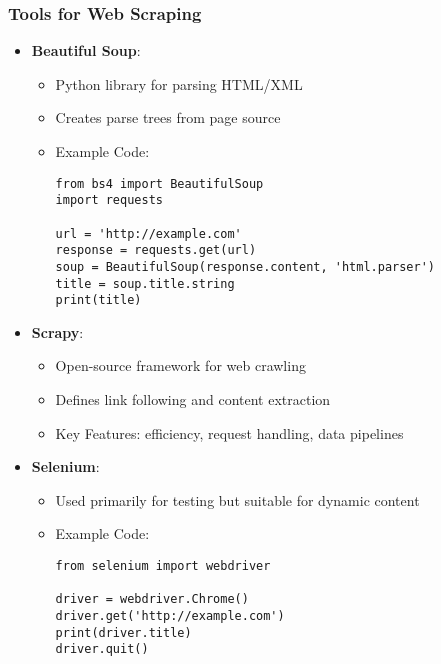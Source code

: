 \documentclass{beamer}
\begin{document}
\begin{frame}[fragile]
    \frametitle{Tools for Web Scraping}
    \begin{itemize}
        \item \textbf{Beautiful Soup}: 
            \begin{itemize}
                \item Python library for parsing HTML/XML 
                \item Creates parse trees from page source 
                \item Example Code:
                \begin{lstlisting}
from bs4 import BeautifulSoup
import requests

url = 'http://example.com'
response = requests.get(url)
soup = BeautifulSoup(response.content, 'html.parser')
title = soup.title.string
print(title)
                \end{lstlisting}
            \end{itemize}

        \item \textbf{Scrapy}:
            \begin{itemize}
                \item Open-source framework for web crawling 
                \item Defines link following and content extraction 
                \item Key Features: efficiency, request handling, data pipelines
            \end{itemize}

        \item \textbf{Selenium}:
            \begin{itemize}
                \item Used primarily for testing but suitable for dynamic content 
                \item Example Code:
                \begin{lstlisting}
from selenium import webdriver

driver = webdriver.Chrome()
driver.get('http://example.com')
print(driver.title)
driver.quit()
                \end{lstlisting}
            \end{itemize}
    \end{itemize}
\end{frame}
\end{document}
